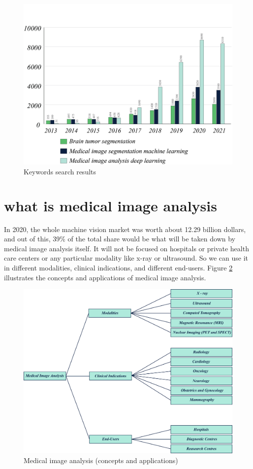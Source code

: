\begin{figure}[h]
	\centering
	\includegraphics[width=1\columnwidth]{./figures/Fig1.jpg}
	\caption{Keywords search results}
	\label{fig1}
\end{figure}

\section{what is medical image analysis}

In 2020, the whole machine vision market was worth about 12.29 billion dollars, and out of this, 39\% of the total share would be what will be taken down by medical image analysis itself. It will not be focused on hospitals or private health care centers or any particular modality like x-ray or ultrasound. So we can use it in different modalities, clinical indications, and different end-users. Figure \ref{fig2} illustrates the concepts and applications of medical image analysis.

\begin{figure}[h]
	\includegraphics[width=1\columnwidth]{./figures/Fig2.png}
	\caption{Medical image analysis (concepts and applications)}
	\label{fig2}
\end{figure}

